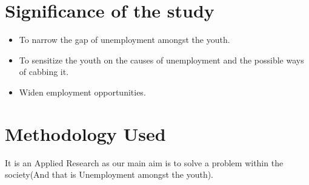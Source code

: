 \documentclass[11pt]{article}
\begin{document}
\section{Significance of the study}
\begin{itemize}
\item To narrow the gap of unemployment amongst the youth.
\item To sensitize the youth on the causes of unemployment and the possible ways of cabbing it.
\item Widen employment opportunities.

\end{itemize}
\section{Methodology Used}
It is an Applied Research as our main aim is to solve a problem within the society(And that is Unemployment amongst the youth).
\end{document}

